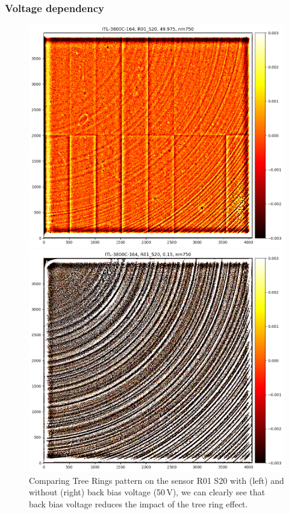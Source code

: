 \subsubsection{Voltage dependency}
\begin{figure}[h]
\centering
\begin{minipage}[b]{0.45\textwidth}
\centering
\includegraphics[width=\textwidth]{figures/R01_S20_wBBV.png}
\end{minipage}
\begin{minipage}[b]{0.45\textwidth}
\centering
\includegraphics[width=\textwidth]{figures/R01_S20_woBBV.png}
\end{minipage}
\caption{Comparing Tree Rings pattern on the sensor R01 S20 with (left) and without (right) back bias voltage (50\,V), we can clearly see that back bias voltage reduces the impact of the tree ring effect.}
\end{figure}

